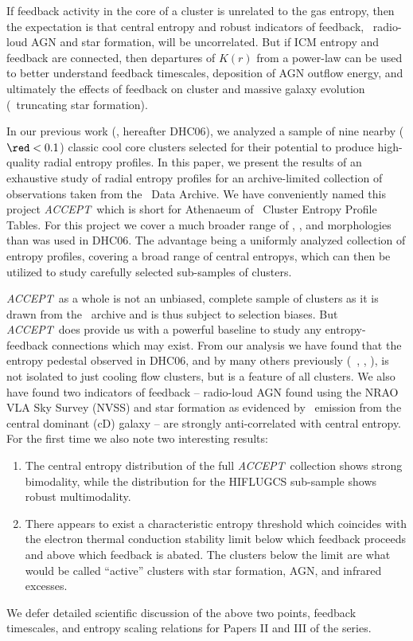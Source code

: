 \documentclass[12pt, preprint]{aastex}
\newcommand{\accept}{\textit{ACCEPT}}
\begin{document}
If feedback activity in the core of a cluster is unrelated to the
gas entropy, then the expectation is that central entropy and
robust indicators of feedback, \eg\ radio-loud AGN and star formation,
will be uncorrelated. But if ICM entropy and feedback are connected,
then departures of $K(r)$ from a power-law can be used to better
understand feedback timescales, deposition of AGN outflow energy,
and ultimately the effects of feedback on cluster and massive galaxy
evolution (\eg\ truncating star formation).

In our previous work (\citealt{2006ApJ...643..730D}, hereafter DHC06),
we analyzed a sample of nine nearby ($\red < 0.1$) classic cool core
clusters selected for their potential to produce high-quality radial
entropy profiles. In this paper, we present the results of an
exhaustive study of radial entropy profiles for an archive-limited
collection of observations taken from the \Chandra\ Data Archive. We have
conveniently named this project \accept\ which is short for Athenaeum
of \Chandra\ Cluster Entropy Profile Tables. For this project we cover
a much broader range of \Lx, \Tx, and morphologies than was used in
DHC06. The advantage being a uniformly analyzed collection of entropy
profiles, covering a broad range of central entropys, which can then be
utilized to study carefully selected sub-samples of clusters.

\accept\ as a whole is not an unbiased, complete sample of clusters as
it is drawn from the \Chandra\ archive and is thus subject to selection
biases. But \accept\ does provide us with a powerful baseline to study
any entropy-feedback connections which may exist. From our analysis we
have found that the entropy pedestal observed in DHC06, and by many
others previously (\eg\ \citealt{1999Natur.397..135P},
\citealt{2000MNRAS.315..689L}, \citealt{2005A&A...433..101P}), is not
isolated to just cooling flow clusters, but is a feature of all
clusters. We also have found two indicators of feedback -- radio-loud
AGN found using the NRAO VLA Sky Survey (NVSS) and star formation as
evidenced by \halpha\ emission from the central dominant (cD) galaxy
-- are strongly anti-correlated with central entropy. For the first
time we also note two interesting results:
\begin{enumerate}
\item The central entropy distribution of the full \accept\ collection
shows strong bimodality, while the distribution for the HIFLUGCS
sub-sample shows robust multimodality. 
\item There appears to exist a characteristic entropy threshold which
coincides with the electron thermal conduction stability limit below
which feedback proceeds and above which feedback is abated. The
clusters below the limit are what would be called ``active'' clusters
with star formation, AGN, and infrared excesses.
\end{enumerate}
We defer detailed scientific discussion of the above two points,
feedback timescales, and entropy scaling relations for Papers II and
III of the series.
\end{document}
